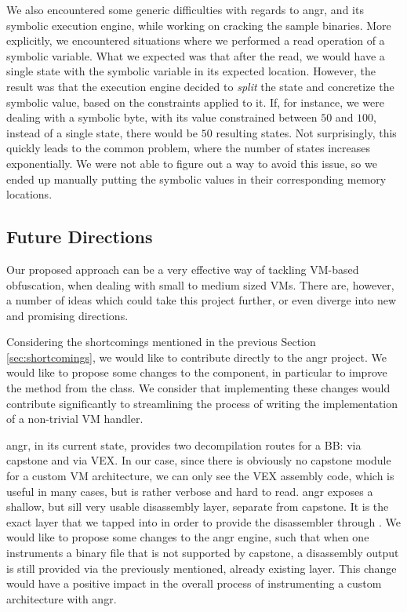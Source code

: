 We also encountered some generic difficulties with regards to angr, and its symbolic execution engine, while working on cracking the sample binaries. More explicitly, we encountered situations where we performed a read operation of a symbolic variable. What we expected was that after the read, we would have a single state with the symbolic variable in its expected location. However, the result was that the execution engine decided to \emph{split} the state and concretize the symbolic value, based on the constraints applied to it. If, for instance, we were dealing with a symbolic byte, with its value constrained between $50$ and $100$, instead of a single state, there would be $50$ resulting states. Not surprisingly, this quickly leads to the common problem, where the number of states increases exponentially. We were not able to figure out a way to avoid this issue, so we ended up manually putting the symbolic values in their corresponding memory locations.
\subsection{Future Directions}

Our proposed approach can be a very effective way of tackling \gls{VM}-based obfuscation, when dealing with small to medium sized \glspl{VM}. There are, however, a number of ideas which could take this project further, or even diverge into new and promising directions.

Considering the shortcomings mentioned in the previous Section \ref{sec:shortcomings}, we would like to contribute directly to the angr project. We would like to propose some changes to the  component, in particular to improve the  method from the  class. We consider that implementing these changes would contribute significantly to streamlining the process of writing the implementation of a non-trivial \gls{VM} handler.

angr, in its current state, provides two decompilation routes for a \gls{BB}: via capstone and via VEX. In our case, since there is obviously no capstone module for a custom \gls{VM} architecture, we can only see the VEX assembly code, which is useful in many cases, but is rather verbose and hard to read. angr exposes a shallow, but sill very usable disassembly layer, separate from capstone. It is the exact layer that we tapped into in order to provide the disassembler through . We would like to propose some changes to the angr engine, such that when one instruments a binary file that is not supported by capstone, a disassembly output is still provided via the previously mentioned, already existing layer. This change would have a positive impact in the overall process of instrumenting a custom architecture with angr.

